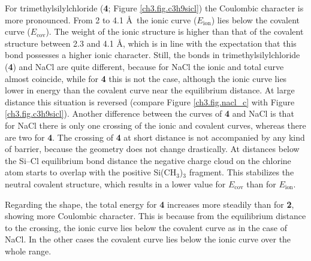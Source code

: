 For trimethylsilylchloride (\textbf{4}; Figure \ref{ch3.fig.c3h9sicl}) the Coulombic character is more pronounced. From 2 to 4.1 \AA\  the ionic curve ($E_\mathrm{ion}$) lies below the covalent curve ($E_\mathrm{cov}$). The weight of the ionic structure is higher than that of the covalent structure between 2.3 and 4.1 \AA, which is in line with the expectation that this bond possesses a higher ionic character. Still, the bonds in trimethylsilylchloride (\textbf{4}) and NaCl are quite different, because for NaCl the ionic and total curve almost coincide, while for \textbf{4} this is not the case, although the ionic curve lies lower in energy than the covalent curve near the equilibrium distance. At large distance this situation is reversed (compare Figure \ref{ch3.fig.nacl_c} with Figure \ref{ch3.fig.c3h9sicl}). Another difference between the curves of \textbf{4} and NaCl is that for NaCl there is only one crossing of the ionic and covalent curves, whereas there are two for \textbf{4}. The crossing of \textbf{4} at short distance is not accompanied by any kind of barrier, because the geometry does not change drastically. At distances below the Si--Cl equilibrium bond distance the negative charge cloud on the chlorine atom starts to overlap with the positive Si(CH$_3$)$_3$ fragment. This stabilizes the neutral covalent structure, which results in a lower value for $E_\mathrm{cov}$ than for $E_\mathrm{ion}$. 

Regarding the shape, the total energy for \textbf{4} increases more steadily than for \textbf{2}, showing more Coulombic character. This is because from the equilibrium distance to the crossing, the ionic curve lies below the covalent curve as in the case of NaCl. In the other cases the covalent curve lies below the ionic curve over the whole range.


